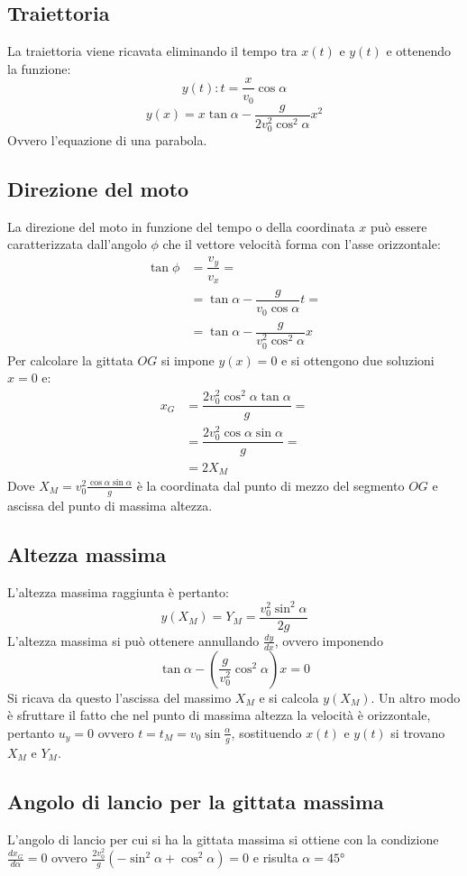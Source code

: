 \documentclass[class=book, crop=false, oneside, 12pt]{standalone}
\begin{document}
	\subsection{Traiettoria}
	La traiettoria viene ricavata eliminando il tempo tra $x(t)$ e $y(t)$ e ottenendo la funzione:
	$$y(t):t=\dfrac{x}{v_0}\cos\alpha$$
	$$y(x)=x\tan\alpha-\dfrac{g}{2v_0^2\cos^2\alpha}x^2$$
	Ovvero l'equazione di una parabola.
	\subsection{Direzione del moto}
	La direzione del moto in funzione del tempo o della coordinata $x$ pu\`o essere caratterizzata dall'angolo $\phi$ che il vettore velocit\`a forma con l'asse orizzontale:
	\begin{align*}
		\tan\phi&=\dfrac{v_y}{v_x}=\\
		        &=\tan\alpha-\dfrac{g}{v_0\cos\alpha}t=\\
				    &=\tan\alpha-\dfrac{g}{v_0^2\cos^2\alpha}x
	\end{align*}
	Per calcolare la gittata $OG$ si impone $y(x)=0$ e si ottengono due soluzioni $x=0$ e:
	\begin{align*}
		x_G&=\dfrac{2v_0^2\cos^2\alpha\tan\alpha}{g}=\\
		   &=\dfrac{2v_0^2\cos\alpha\sin\alpha}{g}=\\
			 &=2X_M
	\end{align*}
	Dove $X_M=v_0^2\frac{\cos\alpha\sin\alpha}{g}$ \`e la coordinata dal punto di mezzo del segmento $OG$ e ascissa del punto di massima altezza.
	\subsection{Altezza massima}
	L'altezza massima raggiunta \`e pertanto:
	$$y(X_M)=Y_M=\dfrac{v_0^2\sin^2\alpha}{2g}$$
	L'altezza massima si pu\`o ottenere annullando $\frac{dy}{dx}$, ovvero imponendo
	$$\tan\alpha-(\dfrac{g}{v_0^2}\cos^2\alpha)x=0$$
	Si ricava da questo l'ascissa del massimo $X_M$ e si calcola $y(X_M)$.
	Un altro modo \`e sfruttare il fatto che nel punto di massima altezza la velocit\`a \`e orizzontale, pertanto $u_y=0$ ovvero $t=t_M=v_0\sin\frac{\alpha}{g}$, sostituendo $x(t)$ e $y(t)$ si trovano $X_M$ e $Y_M$.
	\subsection{Angolo di lancio per la gittata massima}
	L'angolo di lancio per cui si ha la gittata massima si ottiene con la condizione $\frac{dx_G}{d\alpha}=0$ ovvero $\frac{2v_0^2}{g}(-\sin^2\alpha+\cos^2\alpha)=0$ e risulta $\alpha=45\si{\degree}$
\end{document}
